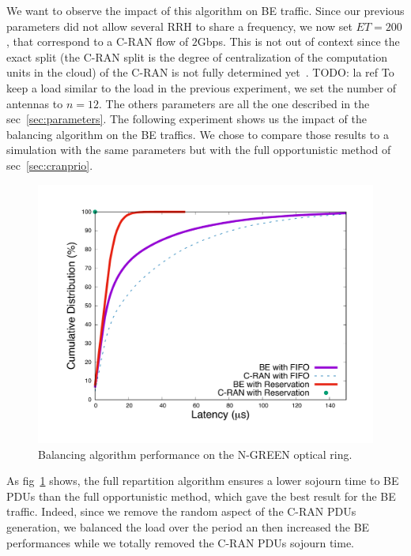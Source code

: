 \documentclass[a4paper,10pt,english]{article}
\newcommand{\todo}[1]{{\color{red} TODO: {#1}}}
\begin{document}
  We want to observe the impact of this algorithm on BE traffic. Since our previous parameters did not allow several RRH to share a frequency, we now set $ET = 200$, that correspond to a C-RAN flow of $2$Gbps. This is not out of context since the exact split (the C-RAN split is the degree of centralization of the computation units in the cloud) of the C-RAN is not fully determined yet~\cite{REF}.\todo {la ref} To keep a load similar to the load in the previous experiment, we set the number of antennas to $n=12$. The others parameters are all the one described in the sec~\ref{sec:parameters}.
  The following experiment shows us the impact of the balancing algorithm on the BE traffics. We chose to compare those results to a simulation with the same parameters but with the full opportunistic method of sec~\ref{sec:cranprio}.
  
   \begin{figure}[h]
\centering
      \includegraphics[scale=0.4]{optim.pdf}
     \caption{Balancing algorithm performance on the N-GREEN optical ring.}   \label{fig:optimres}
  \end{figure}
  
  As fig~\ref{fig:optimres} shows, the full repartition algorithm ensures a lower sojourn time to BE PDUs than the full opportunistic method, which gave the best result for the BE traffic. Indeed, since we remove the random aspect of the C-RAN PDUs generation, we balanced the load over the period an then increased the BE performances while we totally removed the C-RAN PDUs sojourn time.
  
  

\end{document}
